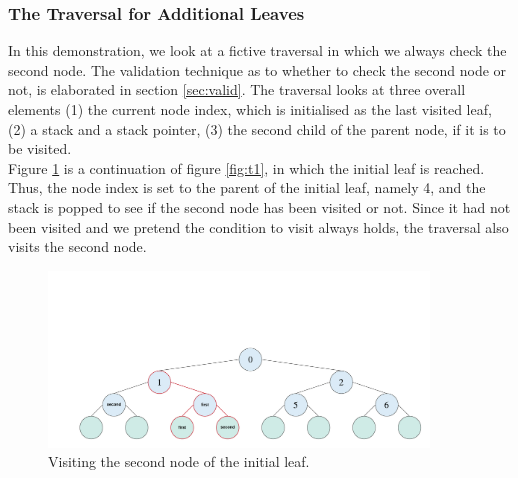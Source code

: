 

\subsubsection{The Traversal for Additional Leaves}


In this demonstration, we look at a fictive traversal in which we always check the second node. The validation technique as to whether to check the second node or not, is elaborated in section \ref{sec:valid}. The traversal looks at three overall elements (1) the current node index, which is initialised as the last visited leaf, (2) a stack and a stack pointer, (3) the second child of the parent node, if it is to be visited. 
\\[2mm]
Figure \ref{fig:t2} is a continuation of figure \ref{fig:t1}, in which the initial leaf is reached. Thus, the node index is set to the parent of the initial leaf, namely 4, and the stack is popped to see if the second node has been visited or not. Since it had not been visited and we pretend the condition to visit always holds, the traversal also visits the second node. 





\begin{figure}[H]
\centering
\includegraphics[width=0.9\textwidth]{pics/kd-tree-visual/5.png}
\caption{Visiting the second node of the initial leaf.}
\label{fig:t2}
\end{figure}

